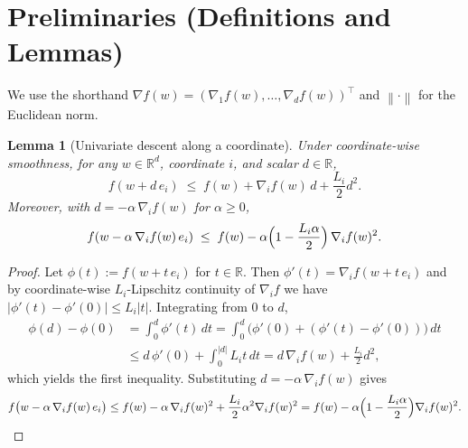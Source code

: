 \documentclass[11pt]{article}
\newtheorem{lemma}{Lemma}
\newcommand{\R}{\mathbb{R}}
\newcommand{\1}{\mathbbm{1}}
\newcommand{\norm}[1]{\left\lVert #1 \right\rVert}
\newcommand{\grad}{\nabla}
\begin{document}
\section*{Preliminaries (Definitions and Lemmas)}
We use the shorthand $\grad f(w)=(\nabla_1 f(w),\dots,\nabla_d f(w))^\top$ and $\norm{\cdot}$ for the Euclidean norm.

\begin{lemma}[Univariate descent along a coordinate]
\label{lem:coord_descent}
Under coordinate-wise smoothness, for any $w\in\R^d$, coordinate $i$, and scalar $d\in\R$,
\[
f(w+d\,e_i) \;\le\; f(w) + \nabla_i f(w)\,d + \frac{L_i}{2} d^2.
\]
Moreover, with $d=-\alpha\,\nabla_i f(w)$ for $\alpha\ge 0$,
\[
f(w-\alpha\,\nabla_i f(w)\,e_i) \;\le\; f(w) - \alpha\Bigl(1-\frac{L_i\alpha}{2}\Bigr)\,\nabla_i f(w)^2.
\]
\end{lemma}
\begin{proof}
Let $\phi(t):=f(w+t\,e_i)$ for $t\in\R$. Then $\phi'(t)=\nabla_i f(w+t\,e_i)$ and by coordinate-wise $L_i$-Lipschitz continuity of $\nabla_i f$ we have $|\phi'(t)-\phi'(0)|\le L_i |t|$. Integrating from $0$ to $d$,
\begin{align*}
\phi(d)-\phi(0)
&= \int_0^d \phi'(t)\,dt
= \int_0^d \bigl(\phi'(0) + (\phi'(t)-\phi'(0))\bigr)\,dt \\
&\le d\,\phi'(0) + \int_0^{|d|} L_i t \, dt
= d\,\nabla_i f(w) + \frac{L_i}{2} d^2,
\end{align*}
which yields the first inequality. Substituting $d=-\alpha\,\nabla_i f(w)$ gives
\[
f\bigl(w-\alpha\,\nabla_i f(w)\,e_i\bigr)
\le f(w) - \alpha\,\nabla_i f(w)^2 + \frac{L_i}{2}\alpha^2 \nabla_i f(w)^2
= f(w) - \alpha\Bigl(1-\frac{L_i\alpha}{2}\Bigr)\nabla_i f(w)^2.\qedhere
\]
\end{proof}
\end{document}
